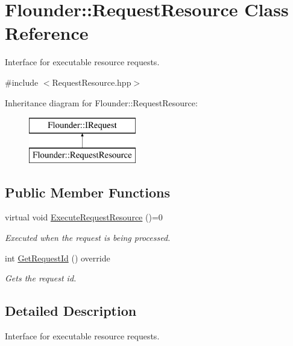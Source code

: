 \hypertarget{class_flounder_1_1_request_resource}{}\section{Flounder\+:\+:Request\+Resource Class Reference}
\label{class_flounder_1_1_request_resource}


Interface for executable resource requests.  




{\ttfamily \#include $<$Request\+Resource.\+hpp$>$}

Inheritance diagram for Flounder\+:\+:Request\+Resource\+:\begin{figure}[H]
\begin{center}
\leavevmode
\includegraphics[height=2.000000cm]{class_flounder_1_1_request_resource}
\end{center}
\end{figure}
\subsection*{Public Member Functions}
\begin{DoxyCompactItemize}
\item 
virtual void \hyperlink{class_flounder_1_1_request_resource_a93b0065fbbed0f41e77206b9df1e216c}{Execute\+Request\+Resource} ()=0
\begin{DoxyCompactList}\small\item\em Executed when the request is being processed. \end{DoxyCompactList}\item 
int \hyperlink{class_flounder_1_1_request_resource_ac116ffcad0790316a97603e874eb6586}{Get\+Request\+Id} () override
\begin{DoxyCompactList}\small\item\em Gets the request id. \end{DoxyCompactList}\end{DoxyCompactItemize}


\subsection{Detailed Description}
Interface for executable resource requests. 



